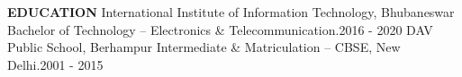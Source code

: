 \documentclass[a4paper, 12pt]{article}
\begin{document}
\section*{}
\begin{vwcol}[widths={0.2, 0.8}, justify=flush, sep=0.7cm, rule=0pt, indent=1em]
\large{\textbf{\textcolor{uclagold}{EDUCATION}}}\newline\newline\newline\newline\newline\newline\newline
\large{International Institute of Information Technology, Bhubaneswar}\vspace{-0.05cm}\newline
\small{\textcolor{frenchblue}{Bachelor of Technology} -- \textcolor{frenchblue}{Electronics \& Telecommunication}}.\hspace{3.05cm}\tiny{2016 - 2020}\vspace{0.2cm}\newline
\large{DAV Public School, Berhampur}\vspace{-0.05cm}\newline
\small{\textcolor{frenchblue}{Intermediate \& Matriculation} -- \textcolor{frenchblue}{CBSE, New Delhi}}.\hspace{4.65cm}\tiny{2001 - 2015}\vspace{-0.05cm}\newline
\normalsize
\end{vwcol}

\vspace{-2.2cm}
\end{document}
